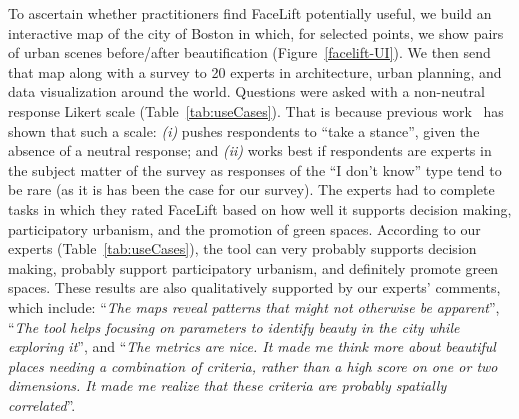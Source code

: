 To ascertain whether practitioners find FaceLift potentially useful, we build an interactive map of the city of Boston in which, for  selected points, we show pairs of urban scenes before/after beautification (Figure~\ref{facelift-UI}). We then send that map along with a survey to 20 experts in architecture, urban planning, and data visualization around the world. Questions were asked with a non-neutral response Likert scale (Table~\ref{tab:useCases}). That is because previous work~\cite{Agree2012,moors2008exploring} has shown that such a scale: \emph{(i)} pushes respondents to ``take a stance'', given the absence of a neutral response; and \emph{(ii)} works best if respondents are experts in the subject matter of the survey as responses of the ``I don't know'' type tend to be rare (as it is has been the case for our survey). The experts had to complete tasks in which they rated FaceLift based on how well it supports decision making, participatory urbanism, and the promotion of green spaces. According to our experts (Table~\ref{tab:useCases}), the tool can very probably supports decision making, probably support participatory urbanism, and definitely promote green spaces.  These results are  also qualitatively supported by our experts' comments, which include: ``\textit{The maps reveal patterns that might not otherwise be apparent}'',  ``\textit{The tool helps focusing on parameters to identify beauty in the city while exploring it}'',  and ``\textit{The metrics are nice. It made me think more about beautiful places needing a combination of criteria, rather than a high score on one or two dimensions. It made me realize that these criteria are probably spatially correlated}''.






